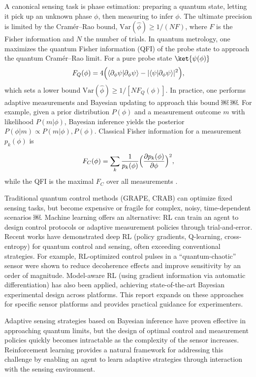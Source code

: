 \documentclass[
    aps,
    prx,
    reprint,
    superscriptaddress,
    amsmath,
    amssymb,
    longbibliography
]{revtex4-2}
\begin{document}
A canonical sensing task is phase estimation: preparing a quantum
state, letting it pick up an unknown phase $\phi$, then measuring to
infer $\phi$.  The ultimate precision is limited by the Cramér–Rao
bound, $\mathrm{Var}(\hat\phi)\ge1/(N F)$, where $F$ is the Fisher
information and $N$ the number of trials.  In quantum metrology, one
maximizes the quantum Fisher information (QFI) of the probe state to
approach the quantum Cramér–Rao limit.  For a pure probe state
$\ket{\psi(\phi)}$
\[
F_Q(\phi)
= 4\Bigl(\langle \partial_\phi \psi|\partial_\phi \psi\rangle - |\langle \psi|\partial_\phi \psi\rangle|^2\Bigr),
\]
which sets a lower bound $\mathrm{Var}(\hat\phi)\ge 1/[N F_Q(\phi)]$.
In practice, one performs adaptive measurements and Bayesian updating
to approach this bound ￼ ￼.  For example, given a prior distribution
$P(\phi)$ and a measurement outcome $m$ with likelihood $P(m|\phi)$,
Bayesian inference yields the posterior $P(\phi|m)\propto
P(m|\phi),P(\phi)$.  Classical Fisher information for a measurement
${p_k(\phi)}$ is

\[
F_C(\phi)=\sum_k \frac{1}{p_k(\phi)}\Bigl(\frac{\partial p_k(\phi)}{\partial \phi}\Bigr)^2,
\]
while the QFI is the maximal $F_C$ over all measurements .

Traditional quantum control methods (GRAPE, CRAB) can optimize fixed
sensing tasks, but become expensive or fragile for complex, noisy,
time-dependent scenarios ￼. Machine learning offers an alternative: RL
can train an agent to design control protocols or adaptive measurement
policies through trial-and-error.  Recent works have demonstrated deep
RL (policy gradients, Q-learning, cross-entropy) for quantum control
and sensing, often exceeding conventional strategies.  For example,
RL-optimized control pulses in a “quantum-chaotic” sensor were shown
to reduce decoherence effects and improve sensitivity by an order of
magnitude.  Model-aware RL (using gradient information via automatic
differentiation) has also been applied, achieving state-of-the-art
Bayesian experimental design across platforms. This report expands on
these approaches for specific sensor platforms and provides practical
guidance for experimenters.



Adaptive sensing strategies based on Bayesian inference have proven
effective in approaching quantum limits, but the design of optimal
control and measurement policies quickly becomes intractable as the
complexity of the sensor increases. Reinforcement learning provides a
natural framework for addressing this challenge by enabling an agent to
learn adaptive strategies through interaction with the sensing
environment.
\end{document}
